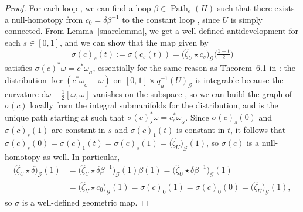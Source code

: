 \documentclass[pdftex]{sigma}
\numberwithin{equation}{section}
\theoremstyle{definition}
\DeclareMathOperator{\Path}{Path}
\newcommand{\MC}[1]{\omega_{{}_{#1}}}
\begin{document}
\begin{proof}
For each loop \smash{$\delta\in\Path_{\hat{\zeta}_U(1)}\bigl(q_{{}_H}^{-1}(U)\bigr)$}, we can find a loop $\beta\in\Path_e(H)$ such that there exists a null-homotopy  from $c_0=\delta\beta^{-1}$ to the constant loop , since $U$ is simply connected. From Lemma~\ref{snarelemma}, we get a well-defined antidevelopment  for each $s\in[0,1]$, and we can show that the map  given by
\[\sigma(c)_s(t):=\sigma(c_s(t))=\bigl(\hat{\zeta}_U\star c_s\bigr)_\mathscr{G}\bigl(\tfrac{1+t}{2}\bigr)\]
satisfies $\sigma(c)^*\omega=c^*\MC{G}$, essentially for the same reason as Theorem~6.1 in \cite[Chapter~3]{Sharpe1997}: the distribution $\ker(c^*\MC{G}-\omega)$ on $[0,1]\times q_{{}_H}^{-1}(U)_\mathscr{G}$ is integrable because the curvature $\mathrm{d}\omega+\tfrac{1}{2}[\omega,\omega]$ vanishes on the subspace , so we can build the graph of $\sigma(c)$ locally from the integral submanifolds for the distribution, and  is the unique path starting at  such that $\sigma(c)_s^*\omega=c_s^*\MC{G}$. Since $\sigma(c)_s(0)$ and $\sigma(c)_s(1)$ are constant in $s$ and $\sigma(c)_1(t)$ is constant in $t$, it follows that $\sigma(c)_s(0)=\sigma(c)_1(t)=\sigma(c)_s(1)=\bigl(\hat{\zeta}_U\bigr)_\mathscr{G}(1)$, so $\sigma(c)$ is a null-homotopy as well. In particular,
\begin{align*}\bigl(\hat{\zeta}_U\star\delta\bigr)_\mathscr{G}(1) & =\bigl(\hat{\zeta}_U\star\delta\beta^{-1}\bigr)_\mathscr{G}(1)\beta(1)=\bigl(\hat{\zeta}_U\star\delta\beta^{-1}\bigr)_\mathscr{G}(1) \\ & =\bigl(\hat{\zeta}_U\star c_0\bigr)_\mathscr{G}(1)=\sigma(c)_0(1)=\sigma(c)_0(0)=\bigl(\hat{\zeta}_U\bigr)_\mathscr{G}(1),
\end{align*} so $\sigma$ is a well-defined geometric map.


\end{proof}
\end{document}
